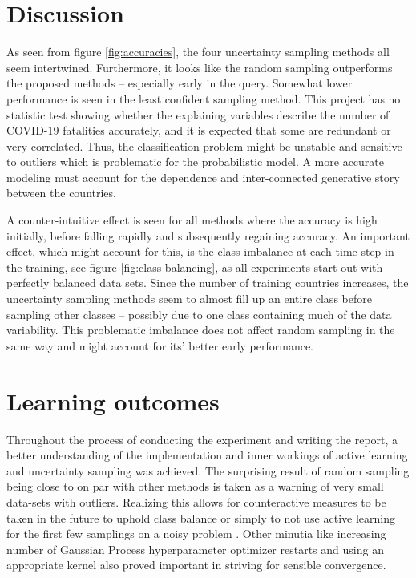 \documentclass[fleqn]{article}
\begin{document}
	
\begin{multicols}{2}

	\section{Discussion} %
		
As seen from figure \ref{fig:accuracies}, the four uncertainty sampling methods all seem intertwined. Furthermore, it looks like the random sampling outperforms the proposed methods -- especially early in the query. Somewhat lower performance is seen in the least confident sampling method. This project has no statistic test showing whether the explaining variables describe the number of COVID-19 fatalities accurately, and it is expected that some are redundant or very correlated. Thus, the classification problem might be  unstable and sensitive to outliers which is problematic for the probabilistic model. A more accurate modeling must account for the dependence and inter-connected generative story between the countries.
	
A counter-intuitive effect is seen for all methods where the accuracy is high initially, before falling rapidly and subsequently regaining accuracy. An important effect, which might account for this, is the class imbalance at each time step in the training, see figure \ref{fig:class-balancing}, as all experiments start out with perfectly balanced data sets. Since the number of training countries increases, the uncertainty sampling methods seem to almost fill up an entire class before sampling other classes -- possibly due to one class containing much of the data variability. This problematic imbalance does not affect random sampling in the same way and might account for its' better early performance.
		
		
\section{Learning outcomes} %
Throughout the process of conducting the experiment and writing the report, a better understanding of the implementation and inner workings of active learning and uncertainty sampling was achieved. The surprising result of random sampling being close to on par with other methods is taken as a warning of very small data-sets with outliers. Realizing this allows for counteractive measures to be taken in the future to uphold class balance or simply to not use active learning for the first few samplings on a noisy problem . Other minutia like increasing number of Gaussian Process hyperparameter optimizer restarts and using an appropriate kernel also proved important in striving for sensible convergence.
		
\end{multicols}
\end{document}
